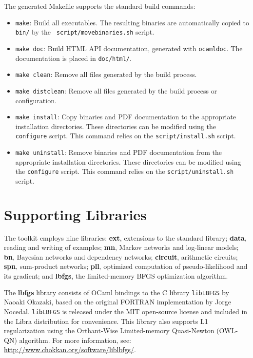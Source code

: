 \documentclass[11pt]{article}
\begin{document}
The generated Makefile supports the standard build commands:
\begin{itemize}
\item {\tt make}: Build all executables.  The resulting binaries are
automatically copied to {\tt bin/} by the {\tt
script/\textunderscore{}move\textunderscore{}binaries.sh} script.

\item {\tt make doc}: Build HTML API documentation, generated with
{\tt ocamldoc}.  The documentation is placed in {\tt doc/html/}.

\item {\tt make clean}: Remove all files generated by the build
process.

\item {\tt make distclean}: Remove all files generated by the build
process or configuration.

\item {\tt make install}: Copy binaries and PDF documentation to the
appropriate installation directories.  These directories can be
modified using the {\tt configure} script.  This command relies on the
{\tt script/\textunderscore{}install.sh} script.

\item {\tt make uninstall}: Remove binaries and PDF documentation from
the appropriate installation directories.  These directories can be
modified using the {\tt configure} script.  This command relies on the
{\tt script/\textunderscore{}uninstall.sh} script.
\end{itemize}

\section{Supporting Libraries}

The toolkit employs nine libraries: {\bf ext}, extensions to the
standard library; {\bf data}, reading and writing of examples; {\bf
mn}, Markov networks and log-linear models; {\bf bn}, Bayesian
networks and dependency networks; {\bf circuit}, arithmetic circuits;
{\bf spn}, sum-product networks; {\bf pll}, optimized computation of
pseudo-likelihood and its gradient; and {\bf lbfgs}, the
limited-memory BFGS optimization algorithm.  

The {\bf lbfgs} library consists of OCaml bindings to the C library
{\tt libLBFGS} by Naoaki Okazaki, based on the original FORTRAN
implementation by Jorge Nocedal.  {\tt libLBFGS} is released under the
MIT open-source license and included in the Libra distribution for
convenience.  This library also supports L1 regularization using the
Orthant-Wise Limited-memory Quasi-Newton (OWL-QN) algorithm.  For more
information, see: \url{http://www.chokkan.org/software/liblbfgs/}.
\end{document}
